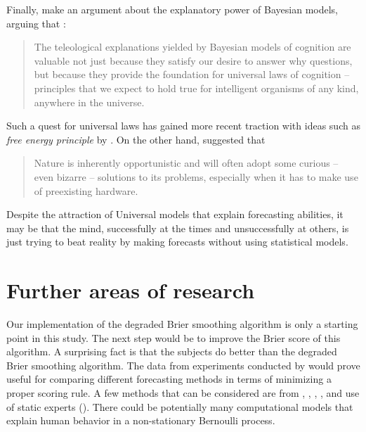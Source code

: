 \documentclass{article}
\begin{document}
Finally, \cite{griffiths2012bayesians} make an argument about the explanatory power of Bayesian models, arguing that :
\begin{quote}
The teleological explanations yielded by Bayesian models of cognition are valuable not just because they satisfy our desire to answer why questions, but because they provide the foundation for universal laws of cognition -- principles that we expect to hold true for intelligent organisms of any kind, anywhere in the universe.
\end{quote}

Such a quest for universal laws has gained more recent traction with ideas such as \textit{free energy principle} by \cite{friston2006free}. On the other hand, \cite{ramachandran1990interactions} suggested that
\begin{quote}
Nature is inherently opportunistic and will often adopt some curious -- even bizarre -- solutions to its problems, especially when it has to make use of preexisting hardware.
\end{quote}

Despite the attraction of Universal models that explain forecasting abilities, it may be that the mind, successfully at the times and unsuccessfully at others, is just trying to beat reality by making forecasts without using statistical models.

\section{Further areas of research}
\label{further}
Our implementation of the degraded Brier smoothing algorithm is only a starting point in this study. The next step would be to improve the Brier score of this algorithm. A surprising fact is that the subjects do better than the degraded Brier smoothing algorithm. The data from experiments conducted by \cite{gallistel2014perception} would prove useful for comparing different forecasting methods in terms of minimizing a proper scoring rule. A few methods that can be considered are from \cite{defesive}, \cite{FREUND200373}, \cite{weissman2001universal}, \cite{vovk2005good}, \cite{rakhlin2015sequential} and use of static experts (\cite{cesa1997use}). There could be potentially many computational models that explain human behavior in a non-stationary Bernoulli process.
\end{document}
